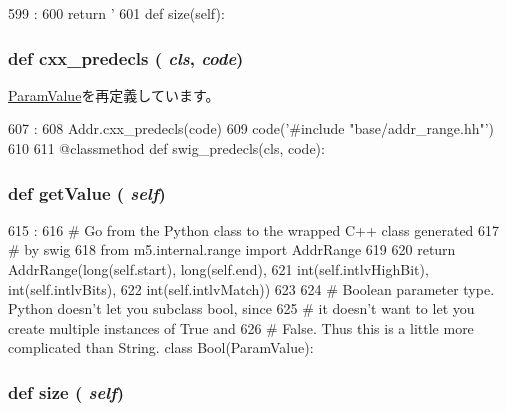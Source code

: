 \begin{DoxyCode}
599                      :
600         return '%
601 
    def size(self):
\end{DoxyCode}
\hypertarget{classm5_1_1params_1_1AddrRange_a0b408a11a14bd1d770e28f71a6e14ab5}{
\subsubsection[{cxx\_\-predecls}]{\setlength{\rightskip}{0pt plus 5cm}def cxx\_\-predecls ( {\em cls}, \/   {\em code})}}
\label{classm5_1_1params_1_1AddrRange_a0b408a11a14bd1d770e28f71a6e14ab5}


\hyperlink{classm5_1_1params_1_1ParamValue_a0b408a11a14bd1d770e28f71a6e14ab5}{ParamValue}を再定義しています。


\begin{DoxyCode}
607                                :
608         Addr.cxx_predecls(code)
609         code('#include "base/addr_range.hh"')
610 
611     @classmethod
    def swig_predecls(cls, code):
\end{DoxyCode}
\hypertarget{classm5_1_1params_1_1AddrRange_acc340fbd4335fa34f9d57fb454b28ed0}{
\subsubsection[{getValue}]{\setlength{\rightskip}{0pt plus 5cm}def getValue ( {\em self})}}
\label{classm5_1_1params_1_1AddrRange_acc340fbd4335fa34f9d57fb454b28ed0}



\begin{DoxyCode}
615                       :
616         # Go from the Python class to the wrapped C++ class generated
617         # by swig
618         from m5.internal.range import AddrRange
619 
620         return AddrRange(long(self.start), long(self.end),
621                          int(self.intlvHighBit), int(self.intlvBits),
622                          int(self.intlvMatch))
623 
624 # Boolean parameter type.  Python doesn't let you subclass bool, since
625 # it doesn't want to let you create multiple instances of True and
626 # False.  Thus this is a little more complicated than String.
class Bool(ParamValue):
\end{DoxyCode}
\hypertarget{classm5_1_1params_1_1AddrRange_a8e64882b52bf2db69e0ec31977c83dc4}{
\subsubsection[{size}]{\setlength{\rightskip}{0pt plus 5cm}def size ( {\em self})}}
\label{classm5_1_1params_1_1AddrRange_a8e64882b52bf2db69e0ec31977c83dc4}



